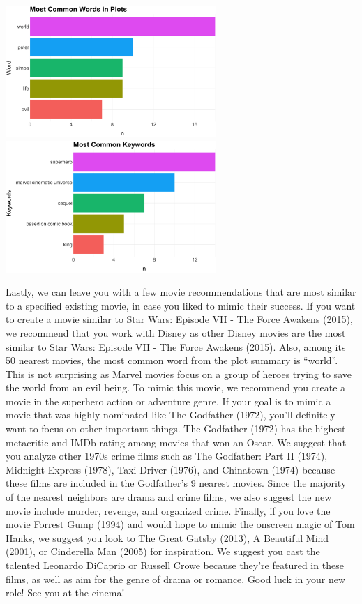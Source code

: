 \documentclass[10pt]{article}
\begin{document}
\begin{center}
\includegraphics[width=8cm]{_assets/_assets_knn/star_wars_common_words.png}
\hspace{1cm}
\includegraphics[width=8cm]{_assets/_assets_knn/star_wars_common_keywords.png}

\end{center}

\quad Lastly, we can leave you with a few movie recommendations that are most similar to a specified existing movie, in case you liked to mimic their success. If you want to create a movie similar to Star Wars: Episode VII - The Force Awakens (2015), we recommend that you work with Disney as other Disney movies are the most similar to Star Wars: Episode VII - The Force Awakens (2015). Also, among its 50 nearest movies, the most common word from the plot summary is “world”. This is not surprising as Marvel movies focus on a group of heroes trying to save the world from an evil being. To mimic this movie, we recommend you create a movie in the superhero action or adventure genre. If your goal is to mimic a movie that was highly nominated like The Godfather (1972), you’ll definitely want to focus on other important things. The Godfather (1972) has the highest metacritic and IMDb rating among movies that won an Oscar. We suggest that you analyze other 1970s crime films such as The Godfather: Part II (1974), Midnight Express (1978), Taxi Driver (1976), and Chinatown (1974) because these films are included in the Godfather’s 9 nearest movies. Since the majority of the nearest neighbors are drama and crime films, we also suggest the new movie include murder, revenge, and organized crime. Finally, if you love the movie Forrest Gump (1994) and would hope to mimic the onscreen magic of Tom Hanks, we suggest you look to The Great Gatsby (2013), A Beautiful Mind (2001), or Cinderella Man (2005) for inspiration. We suggest you cast the talented Leonardo DiCaprio or Russell Crowe because they’re featured in these films, as well as aim for the genre of drama or romance. 
Good luck in your new role! See you at the cinema!

 
\end{document}
